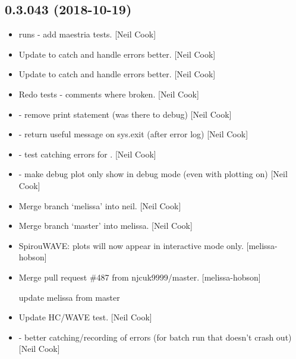 \documentclass[a4paper,10pt,english]{report}
\begin{document}
\subsection{0.3.043 (2018-10-19)}
\label{\detokenize{misc/changelog:id288}}\begin{itemize}
\item {} 
 runs - add maestria tests. {[}Neil Cook{]}

\item {} 
Update  to catch and handle errors better. {[}Neil
Cook{]}

\item {} 
Update  to catch and handle errors better. {[}Neil
Cook{]}

\item {} 
Redo tests - comments where broken. {[}Neil Cook{]}

\item {} 
 - remove print statement (was there to debug) {[}Neil
Cook{]}

\item {} 
 - return useful message on sys.exit (after error log)
{[}Neil Cook{]}

\item {} 
 - test catching errors for . {[}Neil
Cook{]}

\item {} 
 - make debug plot only show in debug mode (even with
plotting on) {[}Neil Cook{]}

\item {} 
Merge branch ‘melissa’ into neil. {[}Neil Cook{]}

\item {} 
Merge branch ‘master’ into melissa. {[}Neil Cook{]}

\item {} 
SpirouWAVE: plots will now appear in interactive mode only. {[}melissa-
hobson{]}

\item {} 
Merge pull request \#487 from njcuk9999/master. {[}melissa-hobson{]}

update melissa from master

\item {} 
Update HC/WAVE test. {[}Neil Cook{]}

\item {} 
 - better catching/recording of errors (for batch run that
doesn’t crash out) {[}Neil Cook{]}


\end{itemize}
\end{document}
